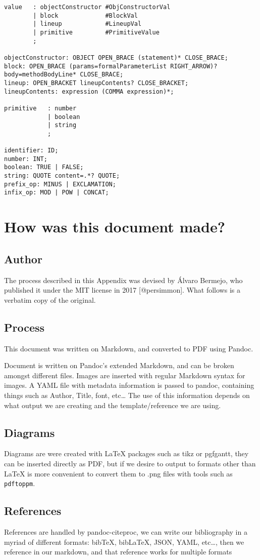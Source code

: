\begin{verbatim}
value   : objectConstructor #ObjConstructorVal
        | block             #BlockVal
        | lineup            #LineupVal
        | primitive         #PrimitiveValue
        ;

objectConstructor: OBJECT OPEN_BRACE (statement)* CLOSE_BRACE;
block: OPEN_BRACE (params=formalParameterList RIGHT_ARROW)? body=methodBodyLine* CLOSE_BRACE;
lineup: OPEN_BRACKET lineupContents? CLOSE_BRACKET;
lineupContents: expression (COMMA expression)*;

primitive   : number
            | boolean
            | string
            ;

identifier: ID;
number: INT;
boolean: TRUE | FALSE;
string: QUOTE content=.*? QUOTE;
prefix_op: MINUS | EXCLAMATION;
infix_op: MOD | POW | CONCAT;
\end{verbatim}

\chapter{How was this document made?}\label{how-was-this-document-made}

\section{Author}\label{author}

The process described in this Appendix was devised by Álvaro Bermejo,
who published it under the MIT license in 2017 {[}@persimmon{]}. What
follows is a verbatim copy of the original.

\section{Process}\label{process}

This document was written on Markdown, and converted to PDF using
Pandoc.

Document is written on Pandoc’s extended Markdown, and can be broken
amongst different files. Images are inserted with regular Markdown
syntax for images. A YAML file with metadata information is passed to
pandoc, containing things such as Author, Title, font, etc\ldots{} The
use of this information depends on what output we are creating and the
template/reference we are using.

\section{Diagrams}\label{diagrams}

Diagrams are were created with LaTeX packages such as tikz or pgfgantt,
they can be inserted directly as PDF, but if we desire to output to
formats other than LaTeX is more convenient to convert them to .png
files with tools such as \texttt{pdftoppm}.

\section{References}\label{references}

References are handled by pandoc-citeproc, we can write our bibliography
in a myriad of different formats: bibTeX, bibLaTeX, JSON, YAML,
etc\ldots{}, then we reference in our markdown, and that reference works
for multiple formats
